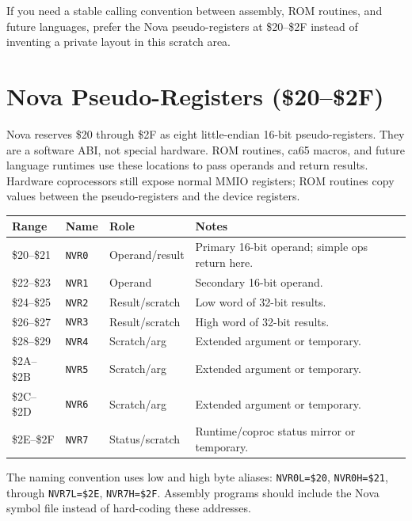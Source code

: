 \begin{tipbox}
If you need a stable calling convention between assembly, ROM routines, and
future languages, prefer the Nova pseudo-registers at \$20--\$2F instead of
inventing a private layout in this scratch area.
\end{tipbox}

\section{Nova Pseudo-Registers (\$20--\$2F)}

Nova reserves \$20 through \$2F as eight little-endian 16-bit pseudo-registers.
They are a software ABI, not special hardware.  ROM routines, ca65 macros,
and future language runtimes use these locations to pass operands and return
results.  Hardware coprocessors still expose normal MMIO registers; ROM
routines copy values between the pseudo-registers and the device registers.

\begin{center}
\small
\begin{tabular}{@{}llll@{}}
\toprule
\textbf{Range} & \textbf{Name} & \textbf{Role} & \textbf{Notes} \\
\midrule
\$20--\$21 & \texttt{NVR0} & Operand/result & Primary 16-bit operand; simple ops return here. \\
\$22--\$23 & \texttt{NVR1} & Operand        & Secondary 16-bit operand. \\
\$24--\$25 & \texttt{NVR2} & Result/scratch & Low word of 32-bit results. \\
\$26--\$27 & \texttt{NVR3} & Result/scratch & High word of 32-bit results. \\
\$28--\$29 & \texttt{NVR4} & Scratch/arg    & Extended argument or temporary. \\
\$2A--\$2B & \texttt{NVR5} & Scratch/arg    & Extended argument or temporary. \\
\$2C--\$2D & \texttt{NVR6} & Scratch/arg    & Extended argument or temporary. \\
\$2E--\$2F & \texttt{NVR7} & Status/scratch & Runtime/coproc status mirror or temporary. \\
\bottomrule
\end{tabular}
\end{center}

The naming convention uses low and high byte aliases:
\texttt{NVR0L=\$20}, \texttt{NVR0H=\$21}, through
\texttt{NVR7L=\$2E}, \texttt{NVR7H=\$2F}.  Assembly programs should include
the Nova symbol file instead of hard-coding these addresses.

